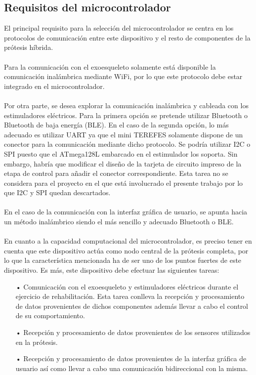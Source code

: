\subsection{Requisitos del microcontrolador}
El principal requisito para la selección del microcontrolador se centra en los protocolos de comunicación entre este dispositivo y el resto de componentes de la prótesis híbrida.
\\
\\
Para la comunicación con el exoesqueleto solamente está disponible la comunicación inalámbrica mediante WiFi, por lo que este protocolo debe estar integrado en el microcontrolador.
\\
\\
Por otra parte, se desea explorar la comunicación inalámbrica y cableada con los estimuladores eléctricos. Para la primera opción se pretende utilizar Bluetooth o Bluetooth de baja energía (BLE). En el caso de la segunda opción, lo más adecuado es utilizar UART ya que el mini TEREFES solamente dispone de un conector para la comunicación mediante dicho protocolo. Se podría utilizar I2C o SPI puesto que el ATmega128L embarcado en el estimulador los soporta. Sin embargo, habría que modificar el diseño de la tarjeta de circuito impreso de la etapa de control para añadir el conector correspondiente. Esta tarea no se considera para el proyecto en el que está involucrado el presente trabajo por lo que I2C y SPI quedan descartados.
\\
\\
En el caso de la comunicación con la interfaz gráfica de usuario, se apunta hacia un método inalámbrico siendo el más sencillo y adecuado Bluetooth o BLE.
\\
\\
En cuanto a la capacidad computacional del microcontrolador, es preciso tener en cuenta que este dispositivo actúa como nodo central de la prótesis completa, por lo que la característica mencionada ha de ser uno de los puntos fuertes de este dispositivo. Es más, este dispositivo debe efectuar las siguientes tareas:

\begin{itemize}
\item[•] Comunicación con el exoesqueleto y estimuladores eléctricos durante el ejercicio de rehabilitación. Esta tarea conlleva la recepción y procesamiento de datos provenientes de dichos componentes además llevar a cabo el control de su comportamiento.
\item[•] Recepción y procesamiento de datos provenientes de los sensores utilizados en la prótesis.
\item[•] Recepción y procesamiento de datos provenientes de la interfaz gráfica de usuario así como llevar a cabo una comunicación bidireccional con la misma.
\end{itemize}

